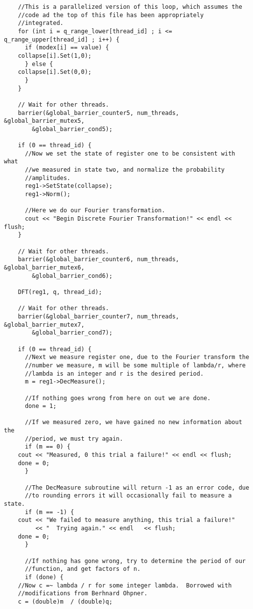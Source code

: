 \documentclass[]{article}
\begin{document}
\begin{verbatim}
    //This is a parallelized version of this loop, which assumes the
    //code ad the top of this file has been appropriately
    //integrated.
    for (int i = q_range_lower[thread_id] ; i <= q_range_upper[thread_id] ; i++) {
      if (modex[i] == value) {
	collapse[i].Set(1,0);
      } else {
	collapse[i].Set(0,0);
      }
    }
    
    // Wait for other threads.
    barrier(&global_barrier_counter5, num_threads, &global_barrier_mutex5, 
	    &global_barrier_cond5);
    
    if (0 == thread_id) {
      //Now we set the state of register one to be consistent with what
      //we measured in state two, and normalize the probability
      //amplitudes.
      reg1->SetState(collapse);
      reg1->Norm();
      
      //Here we do our Fourier transformation.  
      cout << "Begin Discrete Fourier Transformation!" << endl << flush;
    }    

    // Wait for other threads.
    barrier(&global_barrier_counter6, num_threads, &global_barrier_mutex6, 
	    &global_barrier_cond6);

    DFT(reg1, q, thread_id);

    // Wait for other threads.
    barrier(&global_barrier_counter7, num_threads, &global_barrier_mutex7, 
	    &global_barrier_cond7);

    if (0 == thread_id) {
      //Next we measure register one, due to the Fourier transform the
      //number we measure, m will be some multiple of lambda/r, where
      //lambda is an integer and r is the desired period.
      m = reg1->DecMeasure();
      
      //If nothing goes wrong from here on out we are done.
      done = 1;
      
      //If we measured zero, we have gained no new information about the
      //period, we must try again.
      if (m == 0) {
	cout << "Measured, 0 this trial a failure!" << endl << flush;
	done = 0;
      }
      
      //The DecMeasure subroutine will return -1 as an error code, due
      //to rounding errors it will occasionally fail to measure a state.
      if (m == -1) {
	cout << "We failed to measure anything, this trial a failure!" 
	     << "  Trying again." << endl	<< flush;
	done = 0;
      }
      
      //If nothing has gone wrong, try to determine the period of our
      //function, and get factors of n.
      if (done) {
	//Now c =~ lambda / r for some integer lambda.  Borrowed with
	//modifications from Berhnard Ohpner.
	c = (double)m  / (double)q;
	

\end{verbatim}
\end{document}
